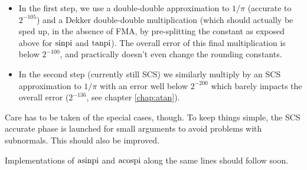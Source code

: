 \begin{itemize}
\item In the first step, we use a double-double approximation to
  $1/\pi$ (accurate to $2^{-105}$) and a Dekker double-double
  multiplication (which should actually be sped up, in the absence of
  FMA, by pre-splitting the constant as exposed above for $\operatorname{sinpi}$ and
  $\operatorname{tanpi}$).  The overall error of this final multiplication is below
  $2^{-100}$, and practically doesn't even change the rounding
  constants.

\item In the second step (currently still SCS) we similarly multiply 
  by an SCS approximation to $1/\pi$ with an  error well below $2^{-200}$
  which barely impacts the  overall error ($2^{-136}$, 
  see chapter \ref{chap:atan}).
\end{itemize}

Care has to be taken of the special cases, though. To keep things
simple, the SCS accurate phase is launched for small arguments to
avoid problems with subnormals. This should also be improved.

Implementations of $\operatorname{asinpi}$ and $\operatorname{acospi}$ along the same lines should
follow soon.
